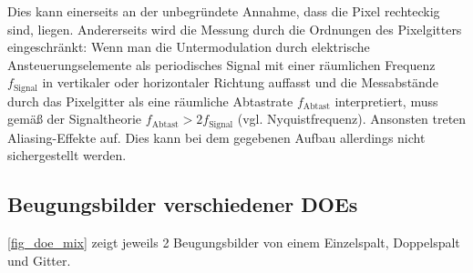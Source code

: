 \documentclass[
	a4paper,
	12pt,
	pagesize,
	ngerman
]{scrartcl}
\begin{document}
			Dies kann einerseits an der unbegründete Annahme, dass die Pixel rechteckig sind, liegen.
			Andererseits wird die Messung durch die Ordnungen des Pixelgitters eingeschränkt:
			Wenn man die Untermodulation durch elektrische Ansteuerungselemente als periodisches Signal mit einer räumlichen Frequenz $ f_\text{Signal} $ in vertikaler oder horizontaler Richtung auffasst und die Messabstände durch das Pixelgitter als eine räumliche Abtastrate $f_\text{Abtast}$ interpretiert, muss gemäß der Signaltheorie $f_\text{Abtast} > 2 f_\text{Signal}$ (vgl. Nyquistfrequenz).
			Ansonsten treten Aliasing-Effekte auf.
			Dies kann bei dem gegebenen Aufbau allerdings nicht sichergestellt werden.

		\subsection{Beugungsbilder verschiedener DOEs}
 		\cref{fig_doe_mix} zeigt jeweils 2 Beugungsbilder von einem Einzelspalt, Doppelspalt und Gitter.
\end{document}
